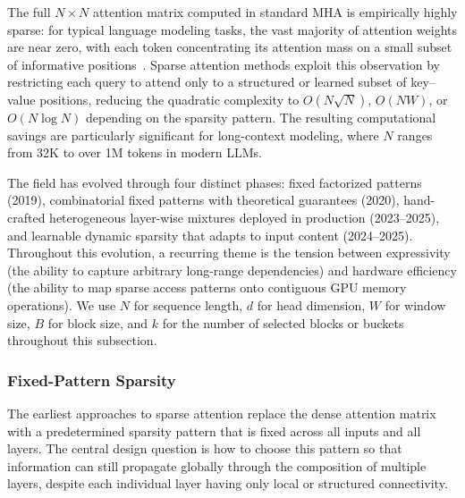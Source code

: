 The full $N \times N$ attention matrix computed in standard MHA is empirically highly sparse: for typical language modeling tasks, the vast majority of attention weights are near zero, with each token concentrating its attention mass on a small subset of informative positions~\cite{child2019generating}. Sparse attention methods exploit this observation by restricting each query to attend only to a structured or learned subset of key--value positions, reducing the quadratic complexity to $O(N\sqrt{N})$, $O(NW)$, or $O(N \log N)$ depending on the sparsity pattern. The resulting computational savings are particularly significant for long-context modeling, where $N$ ranges from 32K to over 1M tokens in modern LLMs.

The field has evolved through four distinct phases: fixed factorized patterns (2019), combinatorial fixed patterns with theoretical guarantees (2020), hand-crafted heterogeneous layer-wise mixtures deployed in production (2023--2025), and learnable dynamic sparsity that adapts to input content (2024--2025). Throughout this evolution, a recurring theme is the tension between expressivity (the ability to capture arbitrary long-range dependencies) and hardware efficiency (the ability to map sparse access patterns onto contiguous GPU memory operations). We use $N$ for sequence length, $d$ for head dimension, $W$ for window size, $B$ for block size, and $k$ for the number of selected blocks or buckets throughout this subsection.


\subsubsection{Fixed-Pattern Sparsity}
\label{subsubsec:fixed-pattern}

The earliest approaches to sparse attention replace the dense attention matrix with a predetermined sparsity pattern that is fixed across all inputs and all layers. The central design question is how to choose this pattern so that information can still propagate globally through the composition of multiple layers, despite each individual layer having only local or structured connectivity.

